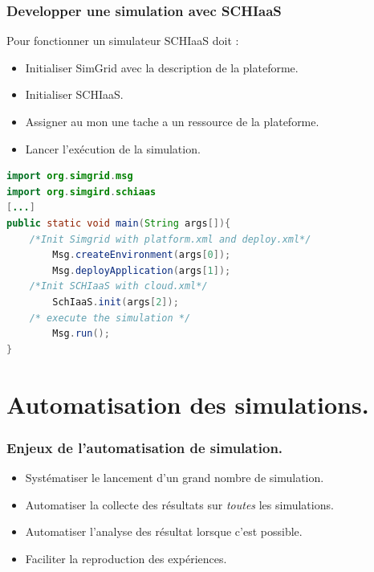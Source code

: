 \documentclass{beamer}
\begin{document}

\begin{frame}[fragile]
	\frametitle{Developper une simulation avec SCHIaaS}
	Pour fonctionner un simulateur SCHIaaS doit :
	\begin{itemize}
		\item Initialiser SimGrid avec la description de la plateforme.
		\item Initialiser SCHIaaS.
		\item Assigner au mon une tache a un ressource de la plateforme.
		\item Lancer l'exécution de la simulation.
	\end{itemize}
	\begin{lstlisting}[basicstyle=\footnotesize,language=Java,
	backgroundcolor=\color{gray!10},
	commentstyle=\color{red!90}
	]
import org.simgrid.msg
import org.simgird.schiaas
[...]
public static void main(String args[]){
    /*Init Simgrid with platform.xml and deploy.xml*/
        Msg.createEnvironment(args[0]);
        Msg.deployApplication(args[1]);
    /*Init SCHIaaS with cloud.xml*/
        SchIaaS.init(args[2]);
    /* execute the simulation */
        Msg.run();
}
\end{lstlisting}

\end{frame}

\section{Automatisation des simulations.}

\begin{frame}
	\frametitle{Enjeux de l'automatisation de simulation.}
	\begin{itemize}
		\item Systématiser le lancement d'un grand nombre de simulation.
		\item Automatiser la collecte des résultats sur \emph{toutes} 
			les simulations.
		\item Automatiser l'analyse des résultat lorsque c'est possible.
		\item Faciliter la reproduction des expériences. 
	\end{itemize}
\end{frame}
\end{document}
